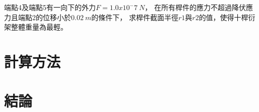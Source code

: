 \documentclass[12pt,a4paper]{article}
\begin{document}
    端點4及端點5有一向下的外力$F = 1.0x10^-7\ N$，
    在所有桿件的應力不超過降伏應力且端點2的位移小於$0.02\ m$的條件下，
    求桿件截面半徑$r1$與$r2$的值，使得十桿衍架整體重量為最輕。
    
\newpage

\section{計算方法}
    


\newpage

\section{結論}
\end{document}
